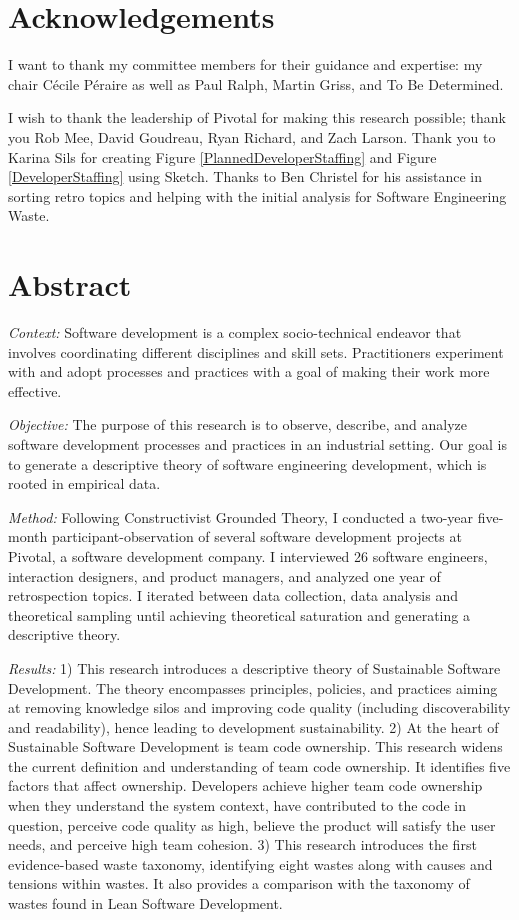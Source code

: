 \documentclass[oneside,letterpaper]{memoir}
\begin{document}
\frontmatter

\thetitlepage
\copyrightpage

\section*{Acknowledgements}
I want to thank my committee members for their guidance and expertise: my chair
 C\'ecile P\'eraire as well as Paul Ralph, Martin Griss, and To Be Determined. 

I wish to thank the leadership of Pivotal for making this research possible; thank you Rob Mee, David Goudreau, Ryan Richard, and Zach Larson. Thank you to Karina Sils for creating Figure \ref{PlannedDeveloperStaffing} and Figure \ref{DeveloperStaffing} using Sketch. Thanks to Ben Christel for his assistance in sorting retro topics and helping with the initial analysis for Software Engineering Waste.

\newpage
\section*{Abstract}
\textit{Context:} Software development is a complex socio-technical endeavor that involves coordinating different disciplines and skill sets. Practitioners experiment with and adopt processes and practices with a goal of making their work more effective.

\textit{Objective:} The purpose of this research is to observe, describe, and analyze software development processes and practices in an industrial setting. Our goal is to generate a descriptive theory of software engineering development, which is rooted in empirical data.

\textit{Method:} Following Constructivist Grounded Theory, I conducted a two-year five-month participant-observation of several software development projects at Pivotal, a software development company. I interviewed 26 software engineers, interaction designers, and product managers, and analyzed one  year  of  retrospection  topics.  I  iterated  between  data collection, data analysis  and  theoretical  sampling  until achieving theoretical  saturation and generating a descriptive theory.

\textit{Results:} 1)  This  research  introduces  a  descriptive  theory  of  Sustainable  Software Development.  The theory encompasses principles, policies, and practices aiming at removing knowledge silos and improving code quality (including discoverability and readability), hence leading to development sustainability. 2) At the heart of Sustainable Software Development is team code ownership. This research widens the current definition and understanding of team code ownership. It identifies five factors that affect ownership.  Developers achieve higher team code ownership when they understand the system context, have contributed to the code in question, perceive code quality as high, believe the product will satisfy the user needs, and perceive high team  cohesion.   3)  This  research  introduces  the  first  evidence-based  waste  taxonomy,  identifying  eight wastes along with causes and tensions within wastes. It also provides a comparison with the taxonomy of wastes found in Lean Software Development.
\end{document}
